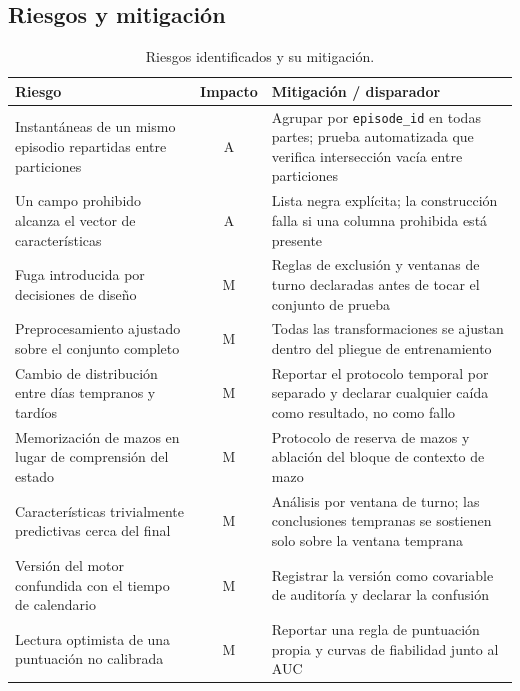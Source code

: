 \documentclass[conference]{IEEEtran}
\newcommand{\code}[1]{\texttt{#1}}
\begin{document}
\subsection{Riesgos y mitigaci\'on}
\label{subsec:risks}
\begin{table}[!t]
\centering
\caption{Riesgos identificados y su mitigaci\'on.}
\label{tab:risks}
\footnotesize
\begin{tabularx}{\columnwidth}{@{}P{1.9cm} c Y@{}}
\toprule
\textbf{Riesgo} & \textbf{Impacto} & \textbf{Mitigaci\'on / disparador}\\
\midrule
Instant\'aneas de un mismo episodio repartidas entre particiones & A &
Agrupar por \code{episode\_id} en todas partes; prueba automatizada que
verifica intersecci\'on vac\'ia entre particiones\\
Un campo prohibido alcanza el vector de caracter\'isticas & A &
Lista negra expl\'icita; la construcci\'on falla si una columna prohibida
est\'a presente\\
Fuga introducida por decisiones de dise\~no & M &
Reglas de exclusi\'on y ventanas de turno declaradas antes de tocar el
conjunto de prueba~\cite{kaufman_leakage_2011}\\
Preprocesamiento ajustado sobre el conjunto completo & M &
Todas las transformaciones se ajustan dentro del pliegue de
entrenamiento~\cite{sasse_leakage_2025}\\
Cambio de distribuci\'on entre d\'ias tempranos y tard\'ios & M &
Reportar el protocolo temporal por separado y declarar cualquier ca\'ida
como resultado, no como fallo~\cite{guo_temporalshift_2021}\\
Memorizaci\'on de mazos en lugar de comprensi\'on del estado & M &
Protocolo de reserva de mazos y ablaci\'on del bloque de contexto de
mazo~\cite{bertram_cardrepresentations_2024}\\
Caracter\'isticas trivialmente predictivas cerca del final & M &
An\'alisis por ventana de turno; las conclusiones tempranas se sostienen
solo sobre la ventana temprana\\
Versi\'on del motor confundida con el tiempo de calendario & M &
Registrar la versi\'on como covariable de auditor\'ia y declarar la
confusi\'on\\
Lectura optimista de una puntuaci\'on no calibrada & M &
Reportar una regla de puntuaci\'on propia y curvas de fiabilidad junto al
AUC~\cite{guo_temporalshift_2021}\\
\bottomrule
\end{tabularx}
\end{table}
\end{document}
